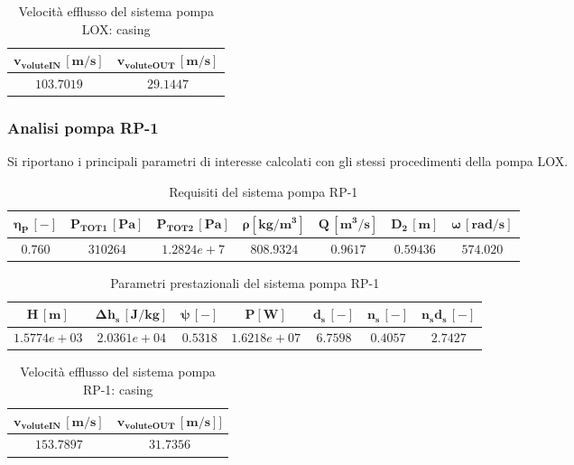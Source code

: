 \begin{table}[H]
\centering
\begin{tabular}{|c|c|}
\hline
$\bm{v_{voluteIN} \, [m/s]}$ & $\bm{v_{voluteOUT} \, [m/s]}$  \\
\hline
$103.7019$ & $29.1447$   \\
\hline
\end{tabular}

\caption{Velocità efflusso del sistema pompa LOX: casing}
\label{table:LOX pump casing}

\end{table}

\subsubsection{Analisi pompa RP-1}
Si riportano i principali parametri di interesse calcolati con gli stessi procedimenti della pompa LOX.

\begin{table}[H]
\centering
\begin{tabular}{|c|c|c|c|c|c|c|}
\hline
$\bm{\eta_P \, [-]}$ & $\bm{P_ {TOT1} \, [Pa]}$ & $\bm{P_{TOT2} \, [Pa]}$ & $\bm{\rho [kg/m^3]}$ & $\bm{Q \, [m^3/s]}$ & $\bm{D_2 \, [m]}$ & $\bm{\omega \, [rad/s]}$  \\
\hline
$0.760$ & $310264$ & $1.2824e+7$ &  $808.9324$ & $0.9617$ & $0.59436$ & $574.020$  \\
\hline
\end{tabular}

\caption{Requisiti del sistema pompa RP-1}
\label{table:RP-1 pump specs}

\end{table}

\begin{table}[H]
\centering
\begin{tabular}{|c|c|c|c|c|c|c|}
\hline
$\bm{H \, [m]}$ & $\bm{\Delta h_s \, [J/kg]}$ & $\bm{\psi \, [-]}$ & $\bm{P [W]}$ & $\bm{d_s \, [-]}$ & $\bm{n_s \, [-]}$ & $\bm{n_s d_s \, [-]}$  \\
\hline
$1.5774e+03$ & $2.0361e+04$ & $0.5318$ &  $1.6218e+07$ & $6.7598$ & $0.4057$ & $2.7427$  \\
\hline
\end{tabular}

\caption{Parametri prestazionali del sistema pompa RP-1}
\label{table:RP-1 pump performance}

\end{table}

\begin{table}[H]
\centering
\begin{tabular}{|c|c|}
\hline
$\bm{v_{voluteIN} \, [m/s]}$ & $\bm{v_{voluteOUT} \, [m/s]]}$  \\
\hline
$153.7897$ & $31.7356$   \\
\hline
\end{tabular}

\caption{Velocità efflusso del sistema pompa RP-1: casing}
\label{table:RP-1 pump casing}

\end{table}



